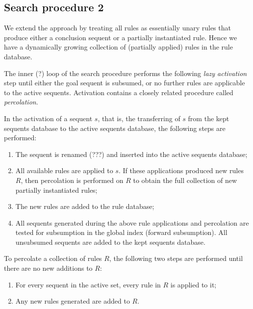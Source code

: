 \documentclass{article}
\theoremstyle{definition}
\begin{document}
\subsection{Search procedure 2}


We extend the approach by treating all rules as essentially unary rules that
produce either a conclusion sequent or a partially instantiated rule. Hence we
have a dynamically growing collection of (partially applied) rules in the rule
database.

The inner (?) loop of the search procedure performs the following \emph{lazy
  activation} step until either the goal sequent is subsumed, or no further
rules are applicable to the active sequents. Activation contains a closely
related procedure called \emph{percolation}.

\begin{definition}
  In the activation of a sequent $s$, that is, the transferring of $s$ from the
  kept sequents database to the active sequents database, the following steps
  are performed:

  \begin{enumerate}
  \item The sequent is renamed (???) and inserted into the active sequents
    database;
  \item All available rules are applied to $s$. If these applications produced
    new rules $R$, then percolation is performed on $R$ to obtain the full
    collection of new partially instantiated rules;
  \item The new rules are added to the rule database;
  \item All sequents generated during the above rule applications and
    percolation are tested for subsumption in the global index (forward
    subsumption). All unsubsumed sequents are added to the kept sequents
    database.
  \end{enumerate}
\end{definition}

\begin{definition}[Percolation]
  To percolate a collection of rules $R$, the following two steps are performed
  until there are no new additions to $R$:

  \begin{enumerate}
  \item For every sequent in the active set, every rule in $R$ is applied to it;
  \item Any new rules generated are added to $R$.
  \end{enumerate}
\end{definition}
\end{document}

